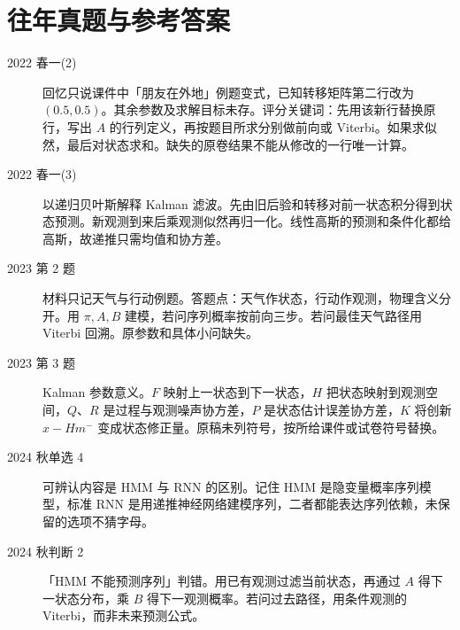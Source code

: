 \documentclass[UTF8,a4paper,zihao=-4,fontset=fandol]{ctexrep}
\begin{document}
\section{往年真题与参考答案}
\begin{description}
\item[2022 春一(2)] 回忆只说课件中「朋友在外地」例题变式，已知转移矩阵第二行改为 $(0.5,0.5)$。其余参数及求解目标未存。评分关键词：先用该新行替换原行，写出 $A$ 的行列定义，再按题目所求分别做前向或 Viterbi。如果求似然，最后对状态求和。缺失的原卷结果不能从修改的一行唯一计算。
\item[2022 春一(3)] 以递归贝叶斯解释 Kalman 滤波。先由旧后验和转移对前一状态积分得到状态预测。新观测到来后乘观测似然再归一化。线性高斯的预测和条件化都给高斯，故递推只需均值和协方差。
\item[2023 第 2 题] 材料只记天气与行动例题。答题点：天气作状态，行动作观测，物理含义分开。用 $\pi,A,B$ 建模，若问序列概率按前向三步。若问最佳天气路径用 Viterbi 回溯。原参数和具体小问缺失。
\item[2023 第 3 题] Kalman 参数意义。$F$ 映射上一状态到下一状态，$H$ 把状态映射到观测空间，$Q$、$R$ 是过程与观测噪声协方差，$P$ 是状态估计误差协方差，$K$ 将创新 $x-Hm^-$ 变成状态修正量。原稿未列符号，按所给课件或试卷符号替换。
\item[2024 秋单选 4] 可辨认内容是 HMM 与 RNN 的区别。记住 HMM 是隐变量概率序列模型，标准 RNN 是用递推神经网络建模序列，二者都能表达序列依赖，未保留的选项不猜字母。
\item[2024 秋判断 2] 「HMM 不能预测序列」判错。用已有观测过滤当前状态，再通过 $A$ 得下一状态分布，乘 $B$ 得下一观测概率。若问过去路径，用条件观测的 Viterbi，而非未来预测公式。
\end{description}

\end{document}
